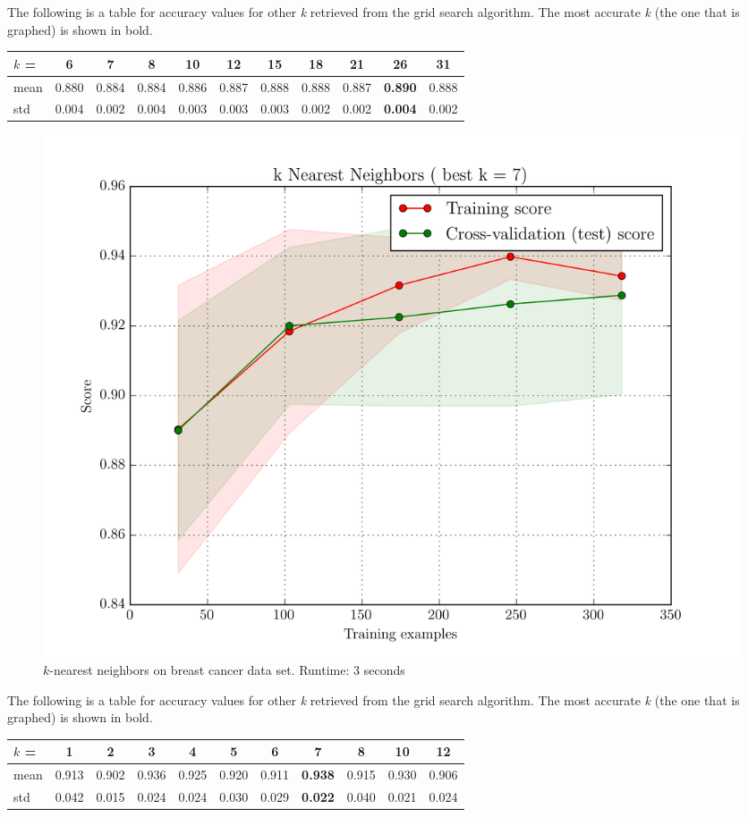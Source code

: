 The following is a table for accuracy values for other \textit{k} retrieved from the grid search algorithm.
The most accurate \textit{k} (the one that is graphed) is shown in bold.
\begin{center}
    \begin{tabular}{l|| c | c | c | c | c | c | c | c | c | c}
        $k$ = & 6     & 7     & 8     & 10    & 12    & 15    & 18    & 21    & \textbf{26}    & 31\\
         \hline
         mean & 0.880 & 0.884 & 0.884 & 0.886 & 0.887 & 0.888 & 0.888 & 0.887 & \textbf{0.890} & 0.888\\
         std  & 0.004 & 0.002 & 0.004 & 0.003 & 0.003 & 0.003 & 0.002 & 0.002 & \textbf{0.004} & 0.002
    \end{tabular}
\end{center}

\begin{figure}[H]
    \centering
    \includegraphics[width=.7\textwidth]{breast/knn.png}
    \caption{$k$-nearest neighbors on breast cancer data set. Runtime: 3 seconds}
\end{figure}

The following is a table for accuracy values for other \textit{k} retrieved from the grid search algorithm.
The most accurate \textit{k} (the one that is graphed) is shown in bold.

\begin{center}
    \begin{tabular}{l|| c | c | c | c | c | c | c | c | c | c}
        $k$ = & 1     & 2     & 3     & 4     & 5     & 6     & \textbf{7}     & 8     & 10    & 12\\
         \hline
         mean & 0.913 & 0.902 & 0.936 & 0.925 & 0.920 & 0.911 & \textbf{0.938} & 0.915 & 0.930 & 0.906\\
         std  & 0.042 & 0.015 & 0.024 & 0.024 & 0.030 & 0.029 & \textbf{0.022} & 0.040 & 0.021 & 0.024
    \end{tabular}
\end{center}

